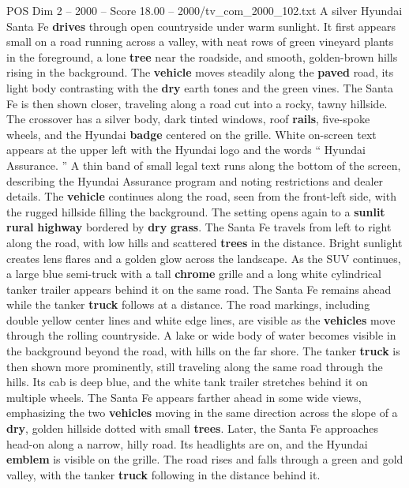 \begin{textsample}{POS Dim 2 – 2000 – Score 18.00 – 2000/tv\_com\_2000\_102.txt}  \label{ex:f2_pos_030}
A silver Hyundai Santa Fe \textbf{drives} through open countryside under warm sunlight.
It first appears small on a road running across a valley, with neat rows of green vineyard plants in the foreground, a lone \textbf{tree} near the roadside, and smooth, golden-brown hills rising in the background.
The \textbf{vehicle} moves steadily along the \textbf{paved} road, its light body contrasting with the \textbf{dry} earth tones and the green vines.
The Santa Fe is then shown closer, traveling along a road cut into a rocky, tawny hillside.
The crossover has a silver body, dark tinted windows, roof \textbf{rails}, five-spoke wheels, and the Hyundai \textbf{badge} centered on the grille.
White on-screen text appears at the upper left with the Hyundai logo and the words “ Hyundai Assurance. ” A thin band of small legal text runs along the bottom of the screen, describing the Hyundai Assurance program and noting restrictions and dealer details.
The \textbf{vehicle} continues along the road, seen from the front-left side, with the rugged hillside filling the background.
The setting opens again to a \textbf{sunlit} \textbf{rural} \textbf{highway} bordered by \textbf{dry} \textbf{grass}.
The Santa Fe travels from left to right along the road, with low hills and scattered \textbf{trees} in the distance.
Bright sunlight creates lens flares and a golden glow across the landscape.
As the SUV continues, a large blue semi-truck with a tall \textbf{chrome} grille and a long white cylindrical tanker trailer appears behind it on the same road.
The Santa Fe remains ahead while the tanker \textbf{truck} follows at a distance.
The road markings, including double yellow center lines and white edge lines, are visible as the \textbf{vehicles} move through the rolling countryside.
A lake or wide body of water becomes visible in the background beyond the road, with hills on the far shore.
The tanker \textbf{truck} is then shown more prominently, still traveling along the same road through the hills.
Its cab is deep blue, and the white tank trailer stretches behind it on multiple wheels.
The Santa Fe appears farther ahead in some wide views, emphasizing the two \textbf{vehicles} moving in the same direction across the slope of a \textbf{dry}, golden hillside dotted with small \textbf{trees}.
Later, the Santa Fe approaches head-on along a narrow, hilly road.
Its headlights are on, and the Hyundai \textbf{emblem} is visible on the grille.
The road rises and falls through a green and gold valley, with the tanker \textbf{truck} following in the distance behind it.

\end{textsample}
